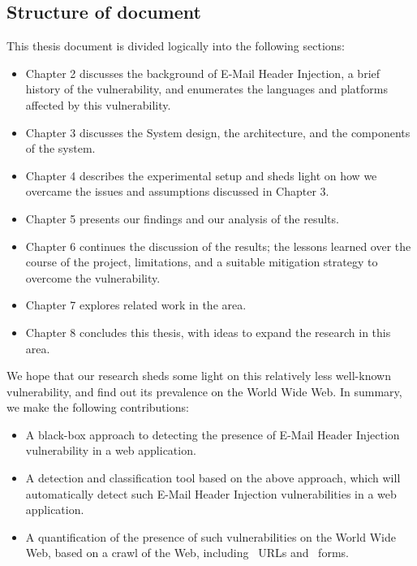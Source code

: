 \subsection*{Structure of document} %
This thesis document is divided logically into the following sections:
\begin{itemize}
	\item Chapter 2 discusses the background of E-Mail Header Injection, a brief history of the vulnerability, and enumerates the languages and platforms affected by this vulnerability.
	
	\item Chapter 3 discusses the System design, the architecture, and the components of the system.
	
	\item Chapter 4 describes the experimental setup and sheds light on how we overcame the issues and assumptions discussed in Chapter 3.
	
	\item Chapter 5 presents our findings and our analysis of the results.
	
	\item Chapter 6 continues the discussion of the results; the lessons learned over the course of the project, limitations, and a suitable mitigation strategy to overcome the vulnerability.
	
	\item Chapter 7 explores related work in the area.
	
	\item Chapter 8 concludes this thesis, with ideas to expand the research in this area.
\end{itemize} 

We hope that our research sheds some light on this relatively less well-known vulnerability, and find out its prevalence on the World Wide Web. In summary, we make the following contributions:
\begin{itemize}
	
	\item{A black-box approach to detecting the presence of E-Mail Header Injection vulnerability in a web application.}
	
	\item{A detection and classification tool based on the above approach, which will automatically detect such E-Mail Header Injection vulnerabilities in a web application.}
	
	\item{A quantification of the presence of such vulnerabilities on the World Wide Web, based on a crawl of the Web, including \urls\ URLs and \forms\ forms.}
	
\end{itemize}